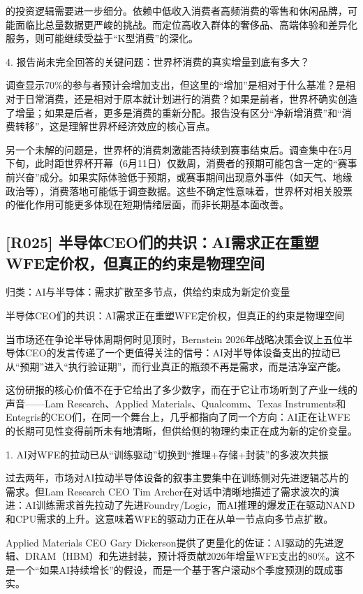 \documentclass[11pt]{ctexart}
\begin{document}
的投资逻辑需要进一步细分。依赖中低收入消费者高频消费的零售和休闲品牌，可能面临比总量数据更严峻的挑战。而定位高收入群体的奢侈品、高端体验和差异化服务，则可能继续受益于“K型消费”的深化。

4. 报告尚未完全回答的关键问题：世界杯消费的真实增量到底有多大？

调查显示70\%的参与者预计会增加支出，但这里的“增加”是相对于什么基准？是相对于日常消费，还是相对于原本就计划进行的消费？如果是前者，世界杯确实创造了增量；如果是后者，更多是消费的重新分配。报告没有区分“净新增消费”和“消费转移”，这是理解世界杯经济效应的核心盲点。

另一个未解的问题是，世界杯的消费刺激能否持续到赛事结束后。调查集中在5月下旬，此时距世界杯开幕（6月11日）仅数周，消费者的预期可能包含一定的“赛事前兴奋”成分。如果实际体验低于预期，或赛事期间出现意外事件（如天气、地缘政治等），消费落地可能低于调查数据。这些不确定性意味着，世界杯对相关股票的催化作用可能更多体现在短期情绪层面，而非长期基本面改善。

\subsection{[R025] 半导体CEO们的共识：AI需求正在重塑WFE定价权，但真正的约束是物理空间}
{\small\color{refgray}归类：AI与半导体：需求扩散至多节点，供给约束成为新定价变量}

半导体CEO们的共识：AI需求正在重塑WFE定价权，但真正的约束是物理空间

当市场还在争论半导体周期何时见顶时，Bernstein 2026年战略决策会议上五位半导体CEO的发言传递了一个更值得关注的信号：AI对半导体设备支出的拉动已从“预期”进入“执行验证期”，而行业真正的瓶颈不再是需求，而是洁净室产能。

这份研报的核心价值不在于它给出了多少数字，而在于它让市场听到了产业一线的声音——Lam Research、Applied Materials、Qualcomm、Texas Instruments和Entegris的CEO们，在同一个舞台上，几乎都指向了同一个方向：AI正在让WFE的长期可见性变得前所未有地清晰，但供给侧的物理约束正在成为新的定价变量。

1. AI对WFE的拉动已从“训练驱动”切换到“推理+存储+封装”的多波次共振

过去两年，市场对AI拉动半导体设备的叙事主要集中在训练侧对先进逻辑芯片的需求。但Lam Research CEO Tim Archer在对话中清晰地描述了需求波次的演进：AI训练需求首先拉动了先进Foundry/Logic，而AI推理的爆发正在驱动NAND和CPU需求的上升。这意味着WFE的驱动力正在从单一节点向多节点扩散。

Applied Materials CEO Gary Dickerson提供了更量化的佐证：AI驱动的先进逻辑、DRAM（HBM）和先进封装，预计将贡献2026年增量WFE支出的80\%。这不是一个“如果AI持续增长”的假设，而是一个基于客户滚动8个季度预测的既成事实。
\end{document}

